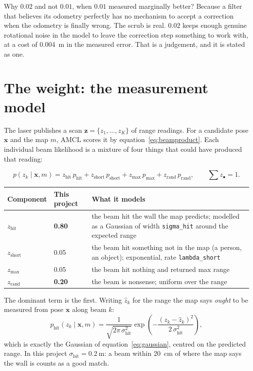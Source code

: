 \documentclass[11pt,a4paper]{report}
\newcommand{\file}[1]{\texttt{\small #1}}
\newcommand{\xt}{\mathbf{x}}
\begin{document}
Why $0.02$ and not $0.01$, when $0.01$ measured marginally better? Because a
filter that believes its odometry perfectly has no mechanism to accept a
correction when the odometry is finally wrong. The scrub is real. $0.02$ keeps
enough genuine rotational noise in the model to leave the correction step
something to work with, at a cost of \SI{0.004}{\metre} in the measured error.
That is a judgement, and it is stated as one.

\section{The weight: the measurement model}
\label{sec:measmodel}

The laser publishes a scan $\mathbf{z} = \{z_1, \ldots, z_K\}$ of range
readings. For a candidate pose $\xt$ and the map $m$, AMCL scores it by
equation~\eqref{eq:beamproduct}. Each individual beam likelihood is a mixture
of four things that could have produced that reading:

\begin{equation}
p(z_k \mid \xt, m)
= z_{\text{hit}}\, p_{\text{hit}}
+ z_{\text{short}}\, p_{\text{short}}
+ z_{\text{max}}\, p_{\text{max}}
+ z_{\text{rand}}\, p_{\text{rand}},
\qquad \textstyle\sum z_\bullet = 1 .
\label{eq:beammix}
\end{equation}

\begin{center}
\begin{tabular}{@{}llp{7.0cm}@{}}
\toprule
\textbf{Component} & \textbf{This project} & \textbf{What it models} \\
\midrule
$z_{\text{hit}}$   & \textbf{0.80} & the beam hit the wall the map predicts;
   modelled as a Gaussian of width \file{sigma\_hit} around the expected range \\
$z_{\text{short}}$ & 0.05 & the beam hit something not in the map (a person,
   an object); exponential, rate \file{lambda\_short} \\
$z_{\text{max}}$   & 0.05 & the beam hit nothing and returned max range \\
$z_{\text{rand}}$  & \textbf{0.20} & the beam is nonsense; uniform over the range \\
\bottomrule
\end{tabular}
\end{center}

\noindent The dominant term is the first. Writing $\hat{z}_k$ for the range
the map says \emph{ought} to be measured from pose $\xt$ along beam $k$:
\begin{equation}
p_{\text{hit}}(z_k \mid \xt, m)
= \frac{1}{\sqrt{2\pi\,\sigma_{\text{hit}}^{2}}}
  \exp\!\left(-\frac{(z_k - \hat{z}_k)^{2}}{2\,\sigma_{\text{hit}}^{2}}\right),
\label{eq:phit}
\end{equation}
which is exactly the Gaussian of equation~\eqref{eq:gaussian}, centred on the
predicted range. In this project $\sigma_{\text{hit}} = \SI{0.2}{\metre}$: a
beam within \SI{20}{\centi\metre} of where the map says the wall is counts as
a good match.
\end{document}
